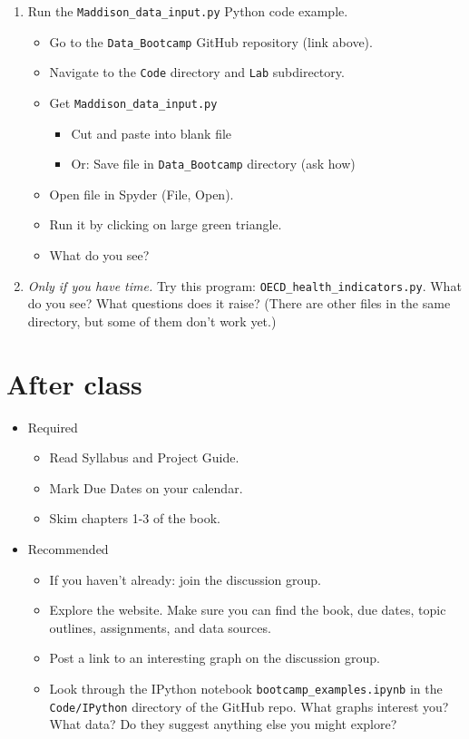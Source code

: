 \begin{enumerate}
\item Run the \verb|Maddison_data_input.py| Python code example.
\begin{itemize}
\item Go to the \verb|Data_Bootcamp| GitHub repository (link above).
\item Navigate to the {\tt Code} directory and {\tt Lab} subdirectory.
\item Get \verb|Maddison_data_input.py|
\begin{itemize}
\item Cut and paste into blank file
\item Or:  Save file in \verb|Data_Bootcamp| directory (ask how)
\end{itemize}
\item Open file in Spyder (File, Open).
\item Run it by clicking on large green triangle.
\item What do you see?
\end{itemize}

\item {\it Only if you have time.\/} Try this program: \verb|OECD_health_indicators.py|.
What do you see?  What questions does it raise?
(There are other files in the same directory, but some of them don't work yet.)

\end{enumerate}

\section*{After class}

\begin{itemize}
\item Required
\begin{itemize}
\item Read Syllabus and Project Guide.
\item Mark Due Dates on your calendar.
\item Skim chapters 1-3 of the book.
\end{itemize}
\item Recommended
\begin{itemize}
\item If you haven't already:  join the discussion group.
\item Explore the website.  Make sure you can find the book, due dates,
topic outlines, assignments, and data sources.
\item Post a link to an interesting graph on the discussion group.
\item Look through the IPython notebook \verb|bootcamp_examples.ipynb|
in the {\tt Code/IPython} directory of the GitHub repo.
What graphs interest you?  What data?
Do they suggest anything else you might explore?
\end{itemize}
\end{itemize}



